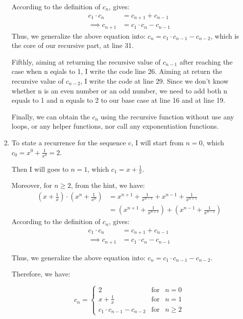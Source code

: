 \documentclass[12pt]{article}
\begin{document}
\begin{enumerate}[label=(\alph*)]
\noindent According to the definition of $c_n$, gives:
\begin{align*}
    c_1 \cdot c_n &= c_{n+1} + c_{n-1} \\
    \implies c_{n+1} &= c_1 \cdot c_n - c_{n-1}
\end{align*}
\noindent Thus, we generalize the above equation into: $c_{n} = c_1 \cdot c_{n-1} - c_{n-2} $, which is the core of our recursive part, at line 31.

\noindent Fifthly, aiming at returning the recursive value of $c_{n-1}$ after reaching the case when n eqials to 1, I write the code line 26.
Aiming at return the recursive value of $c_{n-2}$, I write the code at line 29.
Since we don't know whether n is an even number or an odd number, we need to add both n equals to 1 and n equals to 2 to our base case at line 16 and at line 19.

\noindent Finally, we can obtain the $c_n$ using the recursive function without use any loops, or any helper functions, nor call any exponentiation functions.

    \item To state a recurrence for the sequence c, I will start from $n=0$, which $c_0 = x^0 + \frac{1}{x^0} = 2$.
    
    Then I will goes to $n=1$, which $c_1 = x + \frac{1}{x}$.

    Moreover, for $ n\geq 2$, from the hint, we have:
    \begin{align*}
        (x + \frac{1}{x}) \cdot (x^n + \frac{1}{x^n}) &= x^{n+1} + \frac{1}{x^{n-1}} + x^{n-1} + \frac{1}{x^{n+1}} \\
        &= (x^{n+1} + \frac{1}{x^{n+1}}) + (x^{n-1} + \frac{1}{x^{n-1}})
    \end{align*}
    \noindent According to the definition of $c_n$, gives:
    \begin{align*}
        c_1 \cdot c_n &= c_{n+1} + c_{n-1} \\
        \implies c_{n+1} &= c_1 \cdot c_n - c_{n-1}
    \end{align*}

    Thus, we generalize the above equation into: $c_{n} = c_1 \cdot c_{n-1} - c_{n-2}$.

    Therefore, we have:

    $$c_n =  \left\{ \begin{array}{lcl}
        2 & \mbox{for} & n = 0 \\
        x + \frac{1}{x} & \mbox{for} & n=1 \\
        c_1 \cdot c_{n-1} - c_{n-2} & \mbox{for} & n\geq2
    \end{array}\right. $$


\end{enumerate}
\end{document}
